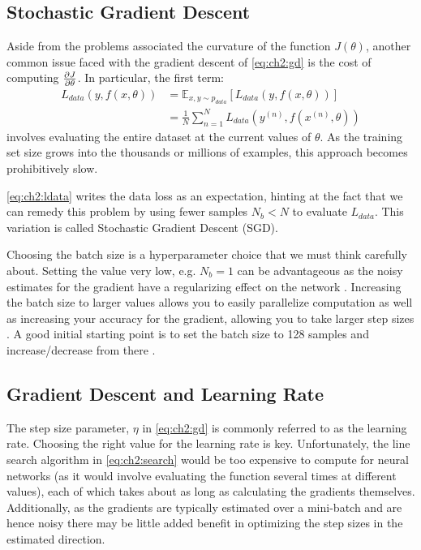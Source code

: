 \subsection{Stochastic Gradient Descent}
Aside from the problems associated the curvature of the function $J(\theta)$,
another common issue faced with the gradient descent of \eqref{eq:ch2:gd} is the
cost of computing $\frac{\partial J}{\partial \theta}$. In particular, the first term:
\begin{align}\label{eq:ch2:ldata}
  L_{data}(y, f(x, \theta)) &= \mathbb{E}_{x,y \sim p_{data}}\left[ L_{data}(y, f(x, \theta))\right] \\
                            &= \frac{1}{N}\sum_{n=1}^N L_{data}\left(y^{(n)}, f(x^{(n)}, \theta)\right)
\end{align}
involves evaluating the entire dataset at the current values of $\theta$. As the
training set size grows into the thousands or millions of examples, this
approach becomes prohibitively slow.

\eqref{eq:ch2:ldata} writes the data loss as an expectation, hinting at the fact that
we can remedy this problem by using fewer samples $N_b < N$ to evaluate $L_{data}$.
This variation is called Stochastic Gradient Descent (SGD).

Choosing the batch size is a hyperparameter choice that we must think carefully
about. Setting the value very low, e.g. $N_b = 1$ can be advantageous as the
noisy estimates for the gradient have a regularizing effect on the network
\cite{wilson_general_2003}. Increasing the batch size to larger values allows
you to easily parallelize computation as well as increasing your accuracy for
the gradient, allowing you to take larger step sizes \cite{smith_dont_2017}.
A good initial starting point is to set the batch size to 128 samples and
increase/decrease from there \cite{goodfellow_deep_2016}.

\subsection{Gradient Descent and Learning Rate}
The step size parameter, $\eta$ in \eqref{eq:ch2:gd} is commonly referred to as
the learning rate. Choosing the right value for the learning rate is key.
Unfortunately, the line search algorithm in \eqref{eq:ch2:search} would be too
expensive to compute for neural networks (as it would involve evaluating the
function several times at different values), each of which takes about as long
as calculating the gradients themselves. Additionally, as the gradients are
typically estimated over a mini-batch and are hence noisy there may be
little added benefit in optimizing the step sizes in the estimated direction.

